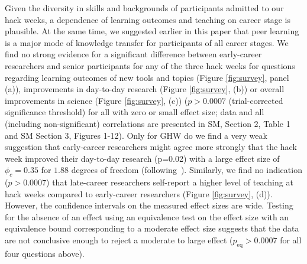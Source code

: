 Given the diversity in skills and backgrounds of participants admitted to our hack weeks, a dependence of learning outcomes and teaching on career stage is plausible. At the same time, we suggested earlier in this paper that peer learning is a major mode of knowledge transfer for participants of all career stages. We find no strong evidence for a significant difference between early-career researchers and senior participants for any of the three hack weeks for questions regarding learning outcomes of new tools and topics (Figure \ref{fig:survey}, panel (a)), improvements in day-to-day research (Figure \ref{fig:survey}, (b)) or overall improvements in science (Figure \ref{fig:survey}, (c)) ($p > 0.0007$ (trial-corrected significance threshold) for all with zero or small effect size; data and all (including non-significant) correlations are presented in SM, Section 2, Table 1 and SM Section 3, Figures 1-12). Only for GHW do we find a very weak suggestion that early-career researchers might agree more strongly that the hack week improved their day-to-day research (p=0.02) with a large effect size of $\phi_c = 0.35$ for $1.88$ degrees of freedom (following~\citep{cohen1988}).
Similarly, we find no indication ($p > 0.0007$) that late-career researchers self-report a higher level of teaching at hack weeks compared to early-career researchers (Figure \ref{fig:survey}, (d)). However, the confidence intervals on the measured effect sizes are wide. Testing for the absence of an effect using an equivalence test on the effect size with an equivalence bound corresponding to a moderate effect size suggests that the data are not conclusive enough to reject a moderate to large effect ($ p_\mathrm{eq} > 0.0007$ for all four questions above).

